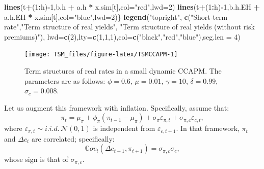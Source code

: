\documentclass[
  12pt,
]{book}
\newenvironment{Shaded}{\begin{snugshade}}{\end{snugshade}}
\newcommand{\AttributeTok}[1]{\textcolor[rgb]{0.13,0.29,0.53}{#1}}
\newcommand{\DecValTok}[1]{\textcolor[rgb]{0.00,0.00,0.81}{#1}}
\newcommand{\FunctionTok}[1]{\textcolor[rgb]{0.13,0.29,0.53}{\textbf{#1}}}
\newcommand{\NormalTok}[1]{#1}
\newcommand{\SpecialCharTok}[1]{\textcolor[rgb]{0.81,0.36,0.00}{\textbf{#1}}}
\newcommand{\StringTok}[1]{\textcolor[rgb]{0.31,0.60,0.02}{#1}}
\theoremstyle{definition}
\theoremstyle{definition}
\theoremstyle{definition}
\theoremstyle{definition}
\theoremstyle{remark}
\begin{document}
\begin{Shaded}
\begin{Highlighting}[]
  \FunctionTok{lines}\NormalTok{(t}\SpecialCharTok{+}\NormalTok{(}\DecValTok{1}\SpecialCharTok{:}\NormalTok{h)}\SpecialCharTok{{-}}\DecValTok{1}\NormalTok{,b.h    }\SpecialCharTok{+}\NormalTok{ a.h    }\SpecialCharTok{*}\NormalTok{ x.sim[t],}\AttributeTok{col=}\StringTok{"red"}\NormalTok{,}\AttributeTok{lwd=}\DecValTok{2}\NormalTok{)}
  \FunctionTok{lines}\NormalTok{(t}\SpecialCharTok{+}\NormalTok{(}\DecValTok{1}\SpecialCharTok{:}\NormalTok{h)}\SpecialCharTok{{-}}\DecValTok{1}\NormalTok{,b.h.EH }\SpecialCharTok{+}\NormalTok{ a.h.EH }\SpecialCharTok{*}\NormalTok{ x.sim[t],}\AttributeTok{col=}\StringTok{"blue"}\NormalTok{,}\AttributeTok{lwd=}\DecValTok{2}\NormalTok{)\}}
\FunctionTok{legend}\NormalTok{(}\StringTok{"topright"}\NormalTok{,}
       \FunctionTok{c}\NormalTok{(}\StringTok{"Short{-}term rate"}\NormalTok{,}\StringTok{"Term structure of real yields"}\NormalTok{,}
         \StringTok{"Term structure of real yields (without risk premiums)"}\NormalTok{),}
       \AttributeTok{lwd=}\FunctionTok{c}\NormalTok{(}\DecValTok{2}\NormalTok{),}\AttributeTok{lty=}\FunctionTok{c}\NormalTok{(}\DecValTok{1}\NormalTok{,}\DecValTok{1}\NormalTok{,}\DecValTok{1}\NormalTok{),}\AttributeTok{col=}\FunctionTok{c}\NormalTok{(}\StringTok{"black"}\NormalTok{,}\StringTok{"red"}\NormalTok{,}\StringTok{"blue"}\NormalTok{),}\AttributeTok{seg.len =} \DecValTok{4}\NormalTok{)}
\end{Highlighting}
\end{Shaded}

\begin{figure}
\texttt{[image: TSM\_files/figure-latex/TSMCCAPM-1]} \caption{Term structures of real rates in a small dynamic CCAPM. The parameters are as follows: $\phi=0.6$, $\mu = 0.01$, $\gamma=10$, $\delta = 0.99$, $\sigma_c=0.008$.}\label{fig:TSMCCAPM}
\end{figure}

Let us augment this framework with inflation. Specifically, assume that:
\[
\pi_t = \mu_\pi + \phi_\pi (\pi_{t-1} - \mu_\pi) + \sigma_\pi \varepsilon_{\pi,t} + \sigma_{\pi,c}\varepsilon_{c,t},
\]
where \(\varepsilon_{\pi,t} \sim i.i.d.\,\mathcal{N}(0,1)\) is independent from \(\varepsilon_{c,t+1}\). In that framework, \(\pi_t\) and \(\Delta c_t\) are correlated; specifically:
\[
\mathbb{C}ov_t(\Delta c_{t+1},\pi_{t+1}) = \sigma_{\pi,c}\sigma_{c},
\]
whose sign is that of \(\sigma_{\pi,c}\).
\end{document}
